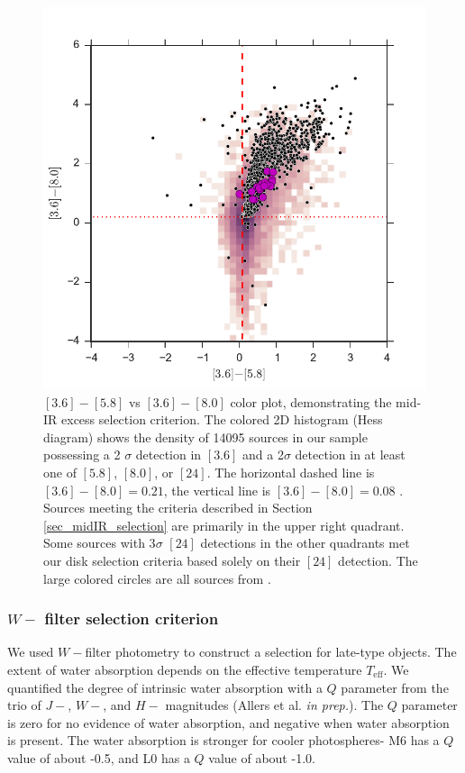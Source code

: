 \begin{figure}[ht!]
  \caption[Mid-infrared color selection]{$[3.6]-[5.8]$ vs $[3.6]-[8.0]$ color plot, demonstrating the mid-IR excess selection criterion.  The colored 2D histogram (Hess diagram) shows the density of 14095 sources in our sample possessing a 2 $\sigma$ detection in $[3.6]$ and a 2$\sigma$ detection in at least one of $[5.8]$, $[8.0]$, or $[24]$.  The horizontal dashed line is $[3.6]-[8.0]=0.21$, the vertical line is $[3.6]-[8.0]=0.08$ \citep{2006ApJ...651..502P}.  Sources meeting the criteria described in Section \ref{sec_midIR_selection} are primarily in the upper right quadrant.  Some sources with 3$\sigma$ $[24]$ detections in the other quadrants met our disk selection criteria based solely on their $[24]$ detection.  The large colored circles are all sources from \citet{allers06}. \label{fig_midIR_selection}}
\centering
\includegraphics[scale=0.6]{chIMACS/figures/disk_selection_allers}
\end{figure}

\subsubsection{$W-$ filter selection criterion}
We used $W-$filter photometry to construct a selection for late-type objects.  The extent of water absorption depends on the effective temperature $T_{\mathrm{eff}}$.  We  quantified the degree of intrinsic water absorption with a $Q$ parameter from the trio of $J-$, $W-$, and $H-$ magnitudes (Allers et al. \emph{in prep.}).  The $Q$ parameter is zero for no evidence of water absorption, and negative when water absorption is present.  The water absorption is stronger for cooler photospheres- M6 has a $Q$ value of about -0.5, and L0 has a $Q$ value of about -1.0.  

